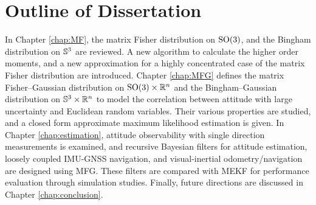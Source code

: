 \section{Outline of Dissertation}

In Chapter \ref{chap:MF}, the matrix Fisher distribution on $\mathrm{SO}(3)$, and the Bingham distribution on $\mathbb{S}^3$ are reviewed.
A new algorithm to calculate the higher order moments, and a new approximation for a highly concentrated case of the matrix Fisher distribution are introduced.
Chapter \ref{chap:MFG} defines the matrix Fisher--Gaussian distribution on $\mathrm{SO}(3) \times \mathbb{R}^n$ and the Bingham--Gaussian distribution on $\mathbb{S}^3\times\mathbb{R}^n$ to model the correlation between attitude with large uncertainty and Euclidean random variables.
Their various properties are studied, and a closed form approximate maximum likelihood estimation is given.
In Chapter \ref{chap:estimation}, attitude observability with single direction measurements is examined, and recursive Bayesian filters for attitude estimation, loosely coupled IMU-GNSS navigation, and visual-inertial odometry/navigation are designed using MFG.
These filters are compared with MEKF for performance evaluation through simulation studies.
Finally, future directions are discussed in Chapter \ref{chap:conclusion}.

